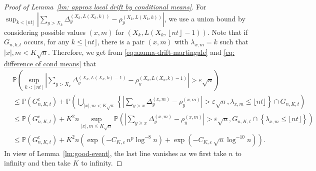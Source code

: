 \documentclass[EJP]{ejpecp} %
\newcommand{\abs}[1]{\left\vert #1 \right\vert}
\begin{document}
\begin{proof}[Proof of Lemma~\ref{lm: approx local drift by conditional means}]
For $\sup_{k <\lfloor nt \rfloor} \left| \sum_{y > X_k} \Delta_y^{\left(X_k,L(X_k, k)\right)} - \rho_y^{\left(X_k,L(X_k, k)\right)} \right|$, we use a union bound by considering possible values $(x,m)$ for $\left(X_k, L\left(X_k, \left\lfloor nt  \right\rfloor - 1\right)\right)$. Note that if $G_{n,k,t}$ occurs, for any $k\leq \lfloor nt \rfloor$, there is a pair $(x,m)$ with $\lambda_{x,m}=k$ such that $\abs{x},m <K\sqrt{n}$. Therefore, we get from \eqref{eq:azuma-drift-martingale} and \eqref{eq: difference of cond means} that 
\begin{align*}
	& \mathbb{P}\left( \sup_{k <\lfloor nt \rfloor} \left| \sum_{y > X_k} 
	\Delta_y^{\left(X_k,L(X_k, k)-1\right)} - \rho_y^{\left(X_k,L(X_k, k)-1\right)}
	\right| > \varepsilon \sqrt{n}  \right) \\
	&\le \mathbb{P}(G_{n, K, t}^c) + \mathbb{P}\left( \bigcup_{|x|, m < K \sqrt{n} } \left\{  \left| \sum_{y > x} \Delta_y^{(x,m)} - \rho_y^{(x,m)} \right|  > \varepsilon \sqrt{n},  \lambda_{x,m} \leq\lfloor nt \rfloor \right\} \cap G_{n,K,t} \right) \\
	&\le \mathbb{P}(G_{n, K, t}^c) + K^2 n \sup _{|x|, m \le  K \sqrt{n} }
	\mathbb{P}\left( \left| \sum_{y \ge x} \Delta_y^{(x,m)} - \rho_y^{(x,m)} \right|  > \varepsilon \sqrt{n} , G_{n,K,t}\cap \left\{\lambda_{x,m} \leq\lfloor nt \rfloor \right\}  \right) \\
	&\le \mathbb{P}(G_{n, K, t}^c) + K^2 n \left( \exp\left( - C_{K, \varepsilon} \, n^{p } \log^{-8} n \right) + \exp\left( - C_{K, \varepsilon} \, \sqrt{n}  \log^{-10} n \right)\right) 
	.\end{align*}
In view of Lemma~\ref{lm:good-event}, the last line vanishes as we first take $n$ to infinity and then take $K$ to infinity.
\end{proof}



\end{document}
